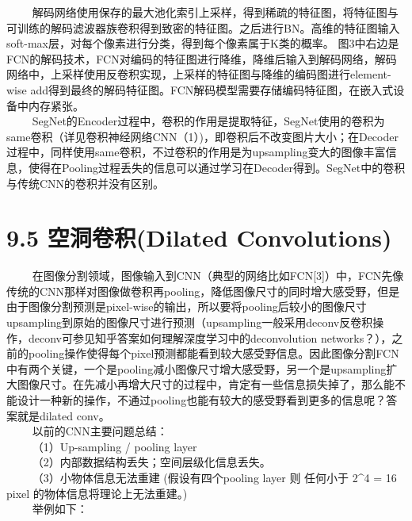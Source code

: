 \begin{figure}
\centering
\end{figure}

  
解码网络使用保存的最大池化索引上采样，得到稀疏的特征图，将特征图与可训练的解码滤波器族卷积得到致密的特征图。之后进行BN。高维的特征图输入soft-max层，对每个像素进行分类，得到每个像素属于K类的概率。
图3中右边是FCN的解码技术，FCN对编码的特征图进行降维，降维后输入到解码网络，解码网络中，上采样使用反卷积实现，上采样的特征图与降维的编码图进行element-wise
add得到最终的解码特征图。FCN解码模型需要存储编码特征图，在嵌入式设备中内存紧张。\\
  
SegNet的Encoder过程中，卷积的作用是提取特征，SegNet使用的卷积为same卷积（详见卷积神经网络CNN（1）)，即卷积后不改变图片大小；在Decoder过程中，同样使用same卷积，不过卷积的作用是为upsampling变大的图像丰富信息，使得在Pooling过程丢失的信息可以通过学习在Decoder得到。SegNet中的卷积与传统CNN的卷积并没有区别。

\section{9.5 空洞卷积(Dilated
Convolutions)}\label{ux7a7aux6d1eux5377ux79efdilated-convolutions}

  
在图像分割领域，图像输入到CNN（典型的网络比如FCN{[}3{]}）中，FCN先像传统的CNN那样对图像做卷积再pooling，降低图像尺寸的同时增大感受野，但是由于图像分割预测是pixel-wise的输出，所以要将pooling后较小的图像尺寸upsampling到原始的图像尺寸进行预测（upsampling一般采用deconv反卷积操作，deconv可参见知乎答案如何理解深度学习中的deconvolution
networks？），之前的pooling操作使得每个pixel预测都能看到较大感受野信息。因此图像分割FCN中有两个关键，一个是pooling减小图像尺寸增大感受野，另一个是upsampling扩大图像尺寸。在先减小再增大尺寸的过程中，肯定有一些信息损失掉了，那么能不能设计一种新的操作，不通过pooling也能有较大的感受野看到更多的信息呢？答案就是dilated
conv。\\
   以前的CNN主要问题总结：\\
   （1）Up-sampling / pooling layer\\
   （2）内部数据结构丢失；空间层级化信息丢失。\\
   （3）小物体信息无法重建 (假设有四个pooling layer 则 任何小于 2\^{}4 =
16 pixel 的物体信息将理论上无法重建。)\\
   举例如下：

\begin{figure}
\centering
\end{figure}

